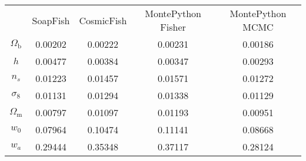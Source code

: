 \begin{table}
\centering
\begin{tabular}{|c|c|c|c|c|}
 & SoapFish & CosmicFish & MontePython Fisher & MontePython MCMC \\
$\Omega_\mathrm{b}$ & 0.00202 & 0.00222 & 0.00231 & 0.00186 \\
$h$ & 0.00477 & 0.00384 & 0.00347 & 0.00293 \\
$n_s$ & 0.01223 & 0.01457 & 0.01571 & 0.01272 \\
$\sigma_8$ & 0.01131 & 0.01294 & 0.01338 & 0.01129 \\
$\Omega_\mathrm{m}$ & 0.00797 & 0.01097 & 0.01193 & 0.00951 \\
$w_0$ & 0.07964 & 0.10474 & 0.11141 & 0.08668 \\
$w_a$ & 0.29444 & 0.35348 & 0.37117 & 0.28124 \\
\end{tabular}
\end{table}
